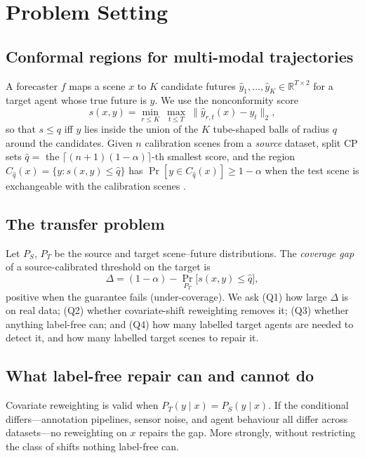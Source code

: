 \section{Problem Setting}\label{sec:problem}
\subsection{Conformal regions for multi-modal trajectories}
A forecaster $f$ maps a scene $x$ to $K$ candidate futures $\hat y_1,\dots,\hat y_K\in\mathbb{R}^{T\times 2}$ for a target
agent whose true future is $y$. We use the nonconformity score
\begin{equation}
s(x,y)=\min_{r\le K}\ \max_{t\le T}\ \|\hat y_{r,t}(x)-y_t\|_2 ,
\end{equation}
so that $s\le q$ iff $y$ lies inside the union of the $K$ tube-shaped balls of radius $q$ around the candidates. Given $n$
calibration scenes from a \emph{source} dataset, split CP sets $\hat q=$ the $\lceil (n+1)(1-\alpha)\rceil$-th smallest score,
and the region $C_{\hat q}(x)=\{y:s(x,y)\le\hat q\}$ has $\Pr[y\in C_{\hat q}(x)]\ge 1-\alpha$ when the test scene is
exchangeable with the calibration scenes \cite{vovk2005algorithmic,angelopoulos2023gentle}.

\subsection{The transfer problem}
Let $P_S$, $P_T$ be the source and target scene--future distributions. The \emph{coverage gap} of a source-calibrated
threshold on the target is
\begin{equation}
\Delta=(1-\alpha)-\Pr_{P_T}\!\big[s(x,y)\le \hat q\big],
\end{equation}
positive when the guarantee fails (under-coverage). We ask (Q1) how large $\Delta$ is on real data; (Q2) whether
covariate-shift reweighting \cite{tibshirani2019covariate} removes it; (Q3) whether anything label-free can; and (Q4) how
many labelled target agents are needed to detect it, and how many labelled target scenes to repair it.

\subsection{What label-free repair can and cannot do}
Covariate reweighting is valid when $P_T(y\mid x)=P_S(y\mid x)$. If the conditional differs---annotation pipelines, sensor
noise, and agent behaviour all differ across datasets---no reweighting on $x$ repairs the gap. More strongly, without
restricting the class of shifts nothing label-free can.

